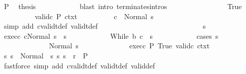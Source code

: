 \begin{isabellebody}
\ P\ \isamarkupfalse%
\ {\isacharquery}thesis\isanewline
\ \ \ \ \ \ \ \ \ \ \isamarkupfalse%
\ {\isacharparenleft}blast\ intro{\isacharcolon}\ terminates{\isachardot}intros{\isacharparenright}\isanewline
\ \ \ \ \ \ \isamarkupfalse%
\isanewline
\ \ \ \ \ \ \ \ \isamarkupfalse%
\ True\isanewline
\ \ \ \ \ \ \ \ \isamarkupfalse%
\ valid{\isacharunderscore}c\ P\ ctxt\isanewline
\ \ \ \ \ \ \ \ \isamarkupfalse%
\ {\isachardoublequoteopen}{\isasymGamma}{\isasymturnstile}c\ {\isasymdown}\ Normal\ s{\isachardoublequoteclose}\isanewline
\ \ \ \ \ \ \ \ \ \ \isamarkupfalse%
\ {\isacharparenleft}simp\ add{\isacharcolon}\ cvalidt{\isacharunderscore}def\ validt{\isacharunderscore}def{\isacharparenright}\isanewline
\ \ \ \ \ \ \ \ \isamarkupfalse%
\isanewline
\ \ \ \ \ \ \ \ \isacommand{{\isacharbraceleft}}\isamarkupfalse%
\isanewline
\ \ \ \ \ \ \ \ \ \ \isamarkupfalse%
\ s{\isacharprime}\isanewline
\ \ \ \ \ \ \ \ \ \ \isamarkupfalse%
\ exec{\isacharunderscore}c{\isacharcolon}\ {\isachardoublequoteopen}{\isasymGamma}{\isasymturnstile}{\isasymlangle}c{\isacharcomma}Normal\ s{\isasymrangle}\ {\isasymRightarrow}\ s{\isacharprime}{\isachardoublequoteclose}\isanewline
\ \ \ \ \ \ \ \ \ \ \isamarkupfalse%
\ {\isachardoublequoteopen}{\isasymGamma}{\isasymturnstile}While\ b\ c\ {\isasymdown}\ s{\isacharprime}{\isachardoublequoteclose}\isanewline
\ \ \ \ \ \ \ \ \ \ \isamarkupfalse%
\ {\isacharparenleft}cases\ s{\isacharprime}{\isacharparenright}\isanewline
\ \ \ \ \ \ \ \ \ \ \ \ \isamarkupfalse%
\ {\isacharparenleft}Normal\ s{\isacharprime}{\isacharprime}{\isacharparenright}\isanewline
\ \ \ \ \ \ \ \ \ \ \ \ \isamarkupfalse%
\ exec{\isacharunderscore}c\ P\ True\ valid{\isacharunderscore}c\ ctxt\isanewline
\ \ \ \ \ \ \ \ \ \ \ \ \isamarkupfalse%
\ s{\isacharprime}{\isacharcolon}\ {\isachardoublequoteopen}s{\isacharprime}\ {\isasymin}\ Normal\ {\isacharbackquote}\ {\isacharparenleft}{\isacharbraceleft}s{\isacharprime}{\isachardot}\ {\isacharparenleft}s{\isacharprime}{\isacharcomma}\ s{\isacharparenright}\ {\isasymin}\ r{\isacharbraceright}\ {\isasyminter}\ P{\isacharparenright}{\isachardoublequoteclose}\isanewline
\ \ \ \ \ \ \ \ \ \ \ \ \ \ \isamarkupfalse%
\ {\isacharparenleft}fastforce\ simp\ add{\isacharcolon}\ cvalidt{\isacharunderscore}def\ validt{\isacharunderscore}def\ valid{\isacharunderscore}def{\isacharparenright}\isanewline

\end{isabellebody}
